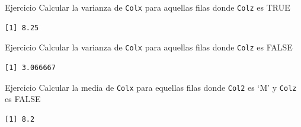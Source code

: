 \documentclass[
  ignorenonframetext,
  aspectratio=169,
  spanish,
]{beamer}
\newenvironment{Shaded}{\begin{snugshade}}{\end{snugshade}}
\newcommand{\FunctionTok}[1]{\textcolor[rgb]{0.28,0.35,0.67}{#1}}
\newcommand{\NormalTok}[1]{\textcolor[rgb]{0.00,0.23,0.31}{#1}}
\newcommand{\SpecialCharTok}[1]{\textcolor[rgb]{0.37,0.37,0.37}{#1}}
\newcommand{\StringTok}[1]{\textcolor[rgb]{0.13,0.47,0.30}{#1}}
\begin{document}
\begin{frame}[fragile]{Ejercicio}
\label{ejercicio-1}
Calcular la varianza de \texttt{Colx} para aquellas filas donde
\texttt{Colz} es TRUE

\begin{Shaded}
\end{Shaded}

\begin{verbatim}
[1] 8.25
\end{verbatim}
\end{frame}

\begin{frame}[fragile]{Ejercicio}
\label{ejercicio-2}
Calcular la varianza de \texttt{Colx} para aquellas filas donde
\texttt{Colz} es FALSE

\begin{Shaded}
\end{Shaded}

\begin{verbatim}
[1] 3.066667
\end{verbatim}
\end{frame}

\begin{frame}[fragile]{Ejercicio}
\label{ejercicio-3}
Calcular la media de \texttt{Colx} para equellas filas donde
\texttt{Col2} es `M' y \texttt{Colz} es FALSE

\begin{Shaded}
\end{Shaded}

\begin{verbatim}
[1] 8.2
\end{verbatim}
\end{frame}
\end{document}
